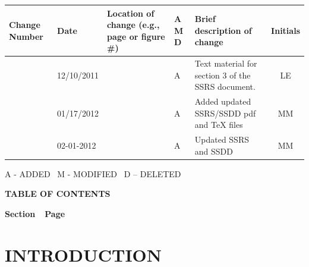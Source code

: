 \documentclass[twoside,letterpaper]{article}
\begin{document}
\begin{flushleft}
\tablehead{}
\begin{supertabular}[c]{|m{0.75in}|m{1.0in}|m{1.5in}|m{0.25in}|m{2in}|c|}
\hline

\centering \bfseries Change
\centering \bfseries Number
&

\centering \bfseries Date
\par
&

\centering \bfseries Location of change\newline
\centering \bfseries(e.g., page or figure \#)
&

\centering \bfseries A\newline
\centering \bfseries M\newline
\centering \bfseries D  
&

\centering \bfseries Brief description\newline
\centering \bfseries of change
&
\bfseries Initials
\\\hline

& 12/10/2011
& ~
& \centering A
& Text material for section 3 of the SSRS document.
& LE

\\\hline
{}
& 01/17/2012
& ~
& \centering A
& Added updated SSRS/SSDD pdf and TeX files
& MM

\\\hline
{}
& 02-01-2012
& ~
& \centering A
& Updated SSRS and SSDD
& MM

\\\hline
\end{supertabular}
\end{flushleft}


{\color{black}
A - ADDED \ M - MODIFIED \ D -- DELETED}


{\centering{}\bfseries\color{black}
TABLE OF CONTENTS
\par}

{\bfseries\color{black}
Section\ \ Page}

\setcounter{tocdepth}{9}
\renewcommand\contentsname{}
\tableofcontents

\bigskip

\bigskip
\clearpage\setcounter{page}{1}\pagestyle{Convertiv}
\section[INTRODUCTION]{\bfseries\color{black}
INTRODUCTION}
\end{document}
